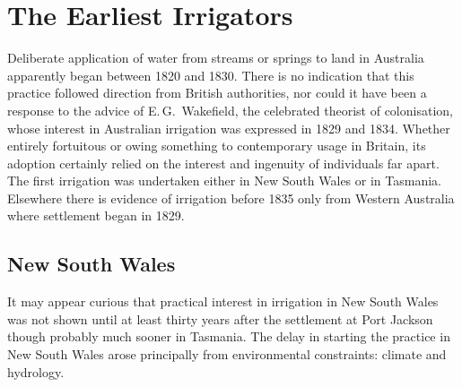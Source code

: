 
\setcounter{endnote}{0}

\chapter{The Earliest Irrigators}
\label{ch:early}



Deliberate application of water from streams or springs to land in
Australia apparently began between 1820 and 1830.  There is no
indication that this practice followed direction from British
authorities, nor could it have been a response to the advice of
E.\,G.~Wakefield, the celebrated theorist of
colonisation, whose interest in Australian irrigation was expressed in
1829 and 1834.  Whether entirely fortuitous or owing something to
contemporary usage in Britain, its adoption certainly relied on the
interest and ingenuity of individuals far apart.  The first irrigation
was undertaken either in New South Wales or in Tasmania.  Elsewhere
there is evidence of irrigation before 1835 only from Western
Australia where settlement began in 1829.

\section*{\textsf{New South Wales}}
\label{sec:nsw}

It may appear curious that practical interest in irrigation in New
South Wales was not shown until at least thirty years after the
settlement at Port Jackson though probably much sooner in Tasmania.
The delay in starting the practice in New South Wales arose
principally from environmental constraints: climate and hydrology.

